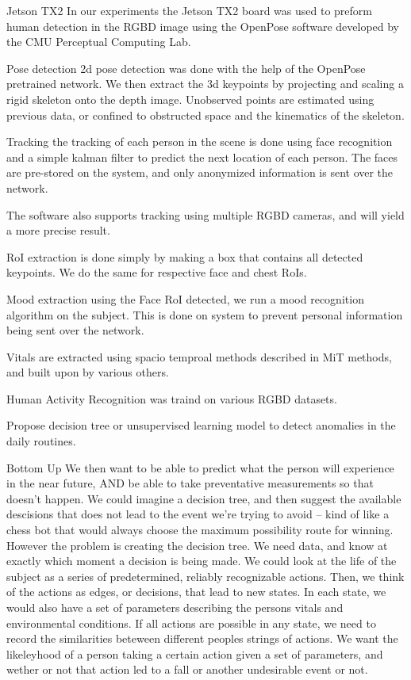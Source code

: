 Jetson TX2
In our experiments the Jetson TX2 board was used to preform human detection in the RGBD image using the OpenPose software developed by the CMU Perceptual Computing Lab. 

Pose detection 2d pose detection was done with the help of the OpenPose pretrained network. We then extract the 3d keypoints by projecting and scaling a rigid skeleton onto the depth image. Unobserved points are estimated using previous data, or confined to obstructed space and the kinematics of the skeleton.

Tracking the tracking of each person in the scene is done using face recognition and a simple kalman filter to predict the next location of each person. The faces are pre-stored on the system, and only anonymized information is sent over the network.

The software also supports tracking using multiple RGBD cameras, and will yield a more precise result. 

RoI extraction is done simply by making a box that contains all detected keypoints. We do the same for respective face and chest RoIs.

Mood extraction using the Face RoI detected, we run a mood recognition algorithm on the subject. This is done on system to prevent personal information being sent over the network.

Vitals are extracted using spacio temproal methods described in MiT methods, and built upon by various others.

Human Activity Recognition was traind on various RGBD datasets.

Propose decision tree or unsupervised learning model to detect anomalies in the daily routines.

Bottom Up
We then want to be able to predict what the person will experience in the near future, AND be able to take preventative measurements so that doesn't happen.
We could imagine a decision tree, and then suggest the available descisions that does not lead to the event we're trying to avoid -- kind of like a chess bot that would always choose the maximum possibility route for winning. However the problem is creating the decision tree. We need data, and know at exactly which moment a decision is being made.
We could look at the life of the subject as a series of predetermined, reliably recognizable actions. Then, we think of the actions as edges, or decisions, that lead to new states. In each state, we would also have a set of parameters describing the persons vitals and environmental conditions. If all actions are possible in any state, we need to record the similarities beteween different peoples strings of actions. We want the likeleyhood of a person taking a certain action given a set of parameters, and wether or not that action led to a fall or another undesirable event or not.

